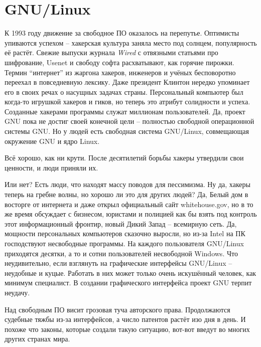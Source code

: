 

\chapter{GNU/Linux}

К 1993 году движение за свободное ПО оказалось на перепутье. Оптимисты упиваются успехом -- хакерская культура заняла место под солнцем, популярность её растёт. Свежие выпуски журнала \textit{Wired} с отвязными статьями про шифрование, Usenet и свободу софта расхватывают, как горячие пирожки. Термин ``интернет'' из жаргона хакеров, инженеров и учёных бесповоротно переехал в повседневную лексику. Даже президент Клинтон нередко упоминает его в своих речах о насущных задачах страны. Персональный компьютер был когда-то игрушкой хакеров и гиков, но теперь это атрибут солидности и успеха. Созданные хакерами программы служат миллионам пользователей. Да, проект GNU пока не достиг своей конечной цели -- полностью свободной операционной системы GNU. Но у людей есть свободная система GNU/Linux, совмещающая окружение GNU и ядро Linux.

Всё хорошо, как ни крути. После десятилетий борьбы хакеры утвердили свои ценности, и люди приняли их.

Или нет? Есть люди, что находят массу поводов для пессимизма. Ну да, хакеры теперь на гребне волны, но хорошо ли это для других людей? Да, Белый дом в восторге от интернета и даже открыл официальный сайт whitehouse.gov, но в то же время обсуждает с бизнесом, юристами и полицией как бы взять под контроль этот информационный фронтир, новый Дикий Запад -- всемирную сеть. Да, мощности персональных компьютеров сказочно выросли, но из-за Intel на ПК господствуют несвободные программы. На каждого пользователя GNU/Linux приходятся десятки, а то и сотни пользователей несвободной Windows. Что неудивительно, если взглянуть на графические интерфейсы GNU/Linux -- неудобные и куцые. Работать в них может только очень искушённый человек, как минимум специалист. В создании графического интерфейса проект GNU терпит неудачу.

Над свободным ПО висит грозовая туча авторского права. Продолжаются судебные тяжбы из-за интерфейсов, а число патентов растёт изо дня в день. И похоже что законы, которые создали такую ситуацию, вот-вот введут во многих других странах мира.

